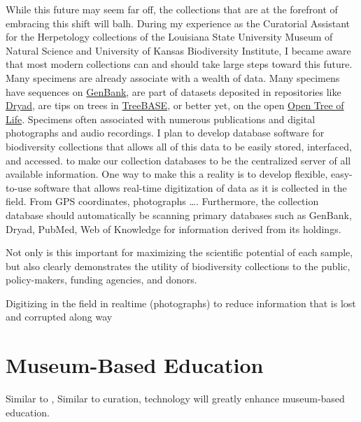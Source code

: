 \documentclass[10pt]{article}
\begin{document}
While this future may seem far off, the collections that are at the forefront
of embracing this shift will balh.
During my experience as the Curatorial Assistant for the Herpetology collections
of the Louisiana State University Museum of Natural Science and University
of Kansas Biodiversity Institute, I became aware that most modern collections
can and should take large steps toward this future.
Many specimens are already associate with a wealth of data.
Many specimens have sequences on
\href{http://www.ncbi.nlm.nih.gov/genbank/}{GenBank}, are part of datasets deposited in
repositories like 
\href{http://datadryad.org}{Dryad},
are tips on trees in \href{http://treebase.org}{TreeBASE}, or better yet,
on the open
\href{http://opentreeoflife.org}{Open Tree of Life}.
Specimens often associated with numerous publications and digital photographs
and audio recordings.
I plan to develop database software for biodiversity collections that allows
all of this data to be easily stored, interfaced, and accessed.
to make our collection databases to be the centralized server of all available
information.
One way to make this a reality is to develop flexible, easy-to-use software
that allows real-time digitization of data as it is collected in the field.
From GPS coordinates, photographs \ldots.
Furthermore, the collection database should automatically be scanning primary databases
such as GenBank, Dryad, PubMed, Web of Knowledge for information derived
from its holdings.

Not only is this important for maximizing the scientific potential of
each sample, but also clearly demonstrates the utility of biodiversity
collections to the public, policy-makers, funding agencies, and donors.

Digitizing in the field in realtime (photographs) to reduce information that is lost and corrupted along way


\section*{Museum-Based Education}
Similar to , 
Similar to curation, technology will greatly enhance museum-based education.


\end{document}
